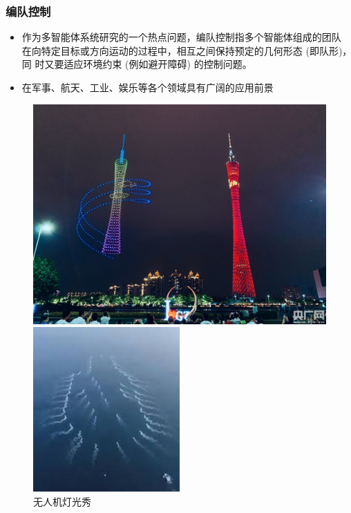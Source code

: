 \documentclass{beamer}
\theoremstyle{remark}
\begin{document}
\begin{frame}
	\frametitle{编队控制}
	\begin{itemize}
		\item 作为多智能体系统研究的一个热点问题，编队控制指多个智能体组成的团队 在向特定目标或方向运动的过程中，相互之间保持预定的几何形态 (即队形)，同 时又要适应环境约束 (例如避开障碍) 的控制问题。
		\item 在军事、航天、工业、娱乐等各个领域具有广阔的应用前景
	\end{itemize}
	\begin{figure}[htbp]
		\centering
		\begin{minipage}[c]{0.33\textwidth} 
				\centering
				\includegraphics[width=1\linewidth]{Fig/show.jpeg}
				\caption{无人机灯光秀}
		\end{minipage}%
		\begin{minipage}[c]{0.33\textwidth}
				\centering
				\includegraphics[width=0.8\linewidth]{Fig/AUV_formation.jpeg}

\end{minipage}
\end{figure}
\end{frame}
\end{document}
